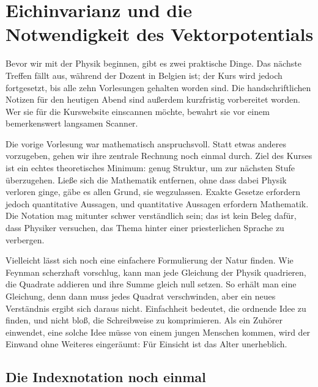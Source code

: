 \chapter{Eichinvarianz und die Notwendigkeit des Vektorpotentials}

Bevor wir mit der Physik beginnen, gibt es zwei praktische Dinge. Das nächste Treffen fällt aus, während der Dozent in Belgien ist; der Kurs wird jedoch fortgesetzt, bis alle zehn Vorlesungen gehalten worden sind. Die handschriftlichen Notizen für den heutigen Abend sind außerdem kurzfristig vorbereitet worden. Wer sie für die Kurswebsite einscannen möchte, bewahrt sie vor einem bemerkenswert langsamen Scanner.

Die vorige Vorlesung war mathematisch anspruchsvoll. Statt etwas anderes vorzugeben, gehen wir ihre zentrale Rechnung noch einmal durch. Ziel des Kurses ist ein echtes theoretisches Minimum: genug Struktur, um zur nächsten Stufe überzugehen. Ließe sich die Mathematik entfernen, ohne dass dabei Physik verloren ginge, gäbe es allen Grund, sie wegzulassen. Exakte Gesetze erfordern jedoch quantitative Aussagen, und quantitative Aussagen erfordern Mathematik. Die Notation mag mitunter schwer verständlich sein; das ist kein Beleg dafür, dass Physiker versuchen, das Thema hinter einer priesterlichen Sprache zu verbergen.

Vielleicht lässt sich noch eine einfachere Formulierung der Natur finden. Wie Feynman scherzhaft vorschlug, kann man jede Gleichung der Physik quadrieren, die Quadrate addieren und ihre Summe gleich null setzen. So erhält man eine Gleichung, denn dann muss jedes Quadrat verschwinden, aber ein neues Verständnis ergibt sich daraus nicht. Einfachheit bedeutet, die ordnende Idee zu finden, und nicht bloß, die Schreibweise zu komprimieren. Als ein Zuhörer einwendet, eine solche Idee müsse von einem jungen Menschen kommen, wird der Einwand ohne Weiteres eingeräumt: Für Einsicht ist das Alter unerheblich.


\section{Die Indexnotation noch einmal}

